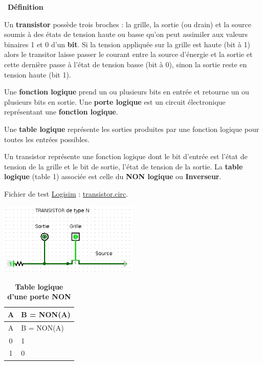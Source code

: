 \documentclass[
  11pt,
]{article}
\newcounter{def}
\newenvironment{definition}[1]
{\par \medskip   \addtocounter{def}{1} \noindent  
\begin{bclogo}[arrondi =0.1,  ombre = true, barre=none, logo=\bcbook, marge=4]{~\textbf{Définition} \textbf{\thedef} {\itshape #1} }  \par}
{
\end{bclogo}
 \par \bigskip }
\newcounter{logi}
\begin{document}
\begin{definition}{}

Un \textbf{transistor} possède trois broches : la grille, la sortie (ou
drain) et la source soumis à des états de tension haute ou basse qu'on
peut assimiler aux valeurs binaires 1 et 0 d'un \textbf{bit}. Si la
tension appliquée sur la grille est haute (bit à 1) alors le transitor
laisse passer le courant entre la source d'énergie et la sortie et cette
dernière passe à l'état de tension basse (bit à 0), sinon la sortie
reste en tension haute (bit 1).

Une \textbf{fonction logique} prend un ou plusieurs bits en entrée et
retourne un ou plusieurs bits en sortie. Une \textbf{porte logique} est
un circuit électronique représentant une \textbf{fonction logique}.

Une \textbf{table logique} représente les sorties produites par une
fonction logique pour toutes les entrées possibles.

Un transistor représente une fonction logique dont le bit d'entrée est
l'état de tension de la grille et le bit de sortie, l'état de tension de
la sortie. La \textbf{table logique} (table 1) associée est celle du
\textbf{NON logique} ou \textbf{Inverseur}.

Fichier de test \href{http://www.cburch.com/logisim/}{Logisim} :
\href{circuits_logisim/transistor.circ}{transistor.circ}.

\end{definition}

\begin{center}{}

\includegraphics[width=0.5\textwidth,height=\textheight]{images/transistor.png}\\

\end{center}

\begin{longtable}[]{@{}cl@{}}
\caption{\textbf{Table logique d'une porte NON}}\tabularnewline
\toprule
A & B = NON(A)\tabularnewline
\midrule
\endfirsthead
\toprule
A & B = NON(A)\tabularnewline
\midrule
\endhead
0 & 1\tabularnewline
1 & 0\tabularnewline
\bottomrule
\end{longtable}
\end{document}
